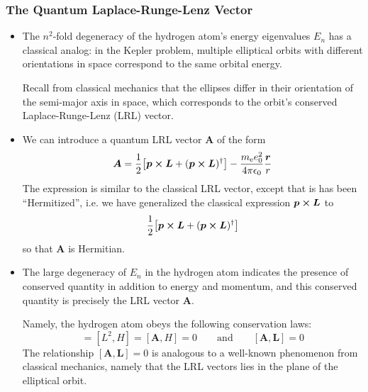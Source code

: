 \documentclass[11pt, a4paper]{article}
\newcommand{\eqtext}[1]{\qquad \text{#1} \qquad}
\renewcommand{\vec}[1]{\bm{#1}}  %
\renewcommand{\r}{\vec{r}}  %
\renewcommand{\L}{\vec{L}}  %
\begin{document}
\subsubsection{The Quantum Laplace-Runge-Lenz Vector}
\begin{itemize}
	\item The $ n^{2} $-fold degeneracy of the hydrogen atom's energy eigenvalues $ E_{n} $ has a classical analog: in the Kepler problem, multiple elliptical orbits with different orientations in space correspond to the same orbital energy. 
	
	Recall from classical mechanics that the ellipses differ in their orientation of the semi-major axis in space, which corresponds to the orbit's conserved Laplace-Runge-Lenz (LRL) vector. 
	
	\item We can introduce a quantum LRL vector $ \vec{A} $ of the form
	\begin{equation*}
		\vec{A} = \frac{1}{2} \big[\vec{p} \cross \L + (\vec{p}\cross \L)^{\dagger}\big] - \frac{m_{\text{e}}e_{0}^{2}}{4\pi \epsilon_{0}} \frac{\r}{r}
	\end{equation*}
	The expression is similar to the classical LRL vector, except that is has been ``Hermitized'', i.e. we have generalized the classical expression $ \vec{p}\cross \vec{L} $ to 
	\begin{equation*}
		\frac{1}{2} \big[\vec{p} \cross \L + (\vec{p}\cross \L)^{\dagger}\big] 
	\end{equation*}
	so that $ \vec{A} $ is Hermitian. 
	
	\item The large degeneracy of $ E_{n} $ in the hydrogen atom indicates the presence of conserved quantity in addition to energy and momentum, and this conserved quantity is precisely the LRL vector $ \vec{A} $. 
	
	Namely, the hydrogen atom obeys the following conservation laws:
	\begin{equation*}
		[\L, H] = [L^{2}, H]  = [\vec{A}, H] = 0 \eqtext{and} [\vec{A}, \L] = 0
	\end{equation*}
	The relationship $ [\vec{A}, \L] = 0 $ is analogous to a well-known phenomenon from classical mechanics, namely that the LRL vectors lies in the plane of the elliptical orbit.
	
\end{itemize}
\end{document}

